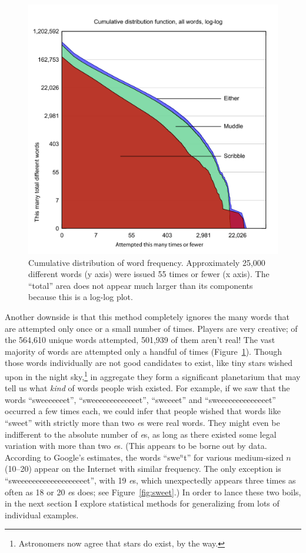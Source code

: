 \documentclass[twocolumn]{article}
\begin{document}
\begin{figure}[t]
\includegraphics[width=\linewidth]{wishlist-cdf}
\vspace{-0.1in}\caption{Cumulative distribution of word frequency.
  Approximately 25,000 different words (y axis) were issued 55 times
  or fewer (x axis). The ``total'' area does not appear much larger
  than its components because this is a log-log plot.}
\label{fig:gamedistribution}
\end{figure}

Another downside is that this method completely ignores the many words
that are attempted only once or a small number of times. Players are
very creative; of the 564,610 unique words attempted, 501,939 of them
aren't real! The vast majority of words are attempted only a handful
of times (Figure~\ref{fig:gamedistribution}). Though those words
individually are not good candidates to exist, like tiny stars wished
upon in the night sky,\!\footnote{Astronomers now agree that stars do
  exist, by the way.} in aggregate they form a significant planetarium
that may tell us what {\it kind} of words people wish existed. For
example, if we saw that the words ``sweeeeeeet'',
``sweeeeeeeeeeeeet'', ``sweeeet'' and ``sweeeeeeeeeeeeeet'' occurred a
few times each, we could infer that people wished that words like
``sweet'' with strictly more than two {\it e}s were real words. They
might even be indifferent to the absolute number of {\it e}s, as long
as there existed some legal variation with more than two {\it e}s.
(This appears to be borne out by data. According to Google's
estimates, the words ``swe$^n$t'' for various medium-sized $n$
(10--20) appear on the Internet with similar frequency. The only
exception is ``sweeeeeeeeeeeeeeeeeeet'', with 19 {\it e}s, which
unexpectedly appears three times as often as 18 or 20 {\it e}s does;
see Figure~\ref{fig:sweet}.) In order to lance these two boils, in the
next section I explore statistical methods for generalizing from lots
of individual examples.
\end{document}

